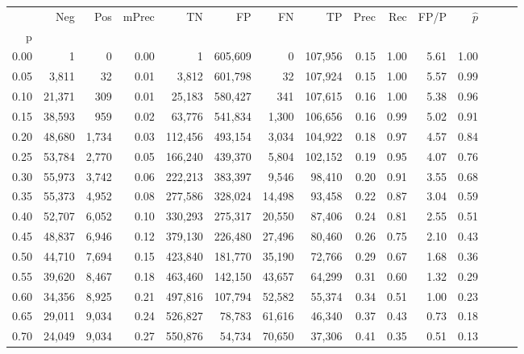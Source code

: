 \begin{tabular}{rrrrrrrrrrrrrrr}
\toprule
{} &     Neg &    Pos & mPrec &       TN &       FP &       FN &       TP &  Prec &   Rec &  FP/P & $\hat{p}$ \\
p    &         &        &       &          &          &          &          &       &       &       &           \\
\midrule
0.00 &       1 &      0 &  0.00 &        1 &  605,609 &        0 &  107,956 &  0.15 &  1.00 &  5.61 &      1.00 \\
0.05 &   3,811 &     32 &  0.01 &    3,812 &  601,798 &       32 &  107,924 &  0.15 &  1.00 &  5.57 &      0.99 \\
0.10 &  21,371 &    309 &  0.01 &   25,183 &  580,427 &      341 &  107,615 &  0.16 &  1.00 &  5.38 &      0.96 \\
0.15 &  38,593 &    959 &  0.02 &   63,776 &  541,834 &    1,300 &  106,656 &  0.16 &  0.99 &  5.02 &      0.91 \\
0.20 &  48,680 &  1,734 &  0.03 &  112,456 &  493,154 &    3,034 &  104,922 &  0.18 &  0.97 &  4.57 &      0.84 \\
0.25 &  53,784 &  2,770 &  0.05 &  166,240 &  439,370 &    5,804 &  102,152 &  0.19 &  0.95 &  4.07 &      0.76 \\
0.30 &  55,973 &  3,742 &  0.06 &  222,213 &  383,397 &    9,546 &   98,410 &  0.20 &  0.91 &  3.55 &      0.68 \\
0.35 &  55,373 &  4,952 &  0.08 &  277,586 &  328,024 &   14,498 &   93,458 &  0.22 &  0.87 &  3.04 &      0.59 \\
0.40 &  52,707 &  6,052 &  0.10 &  330,293 &  275,317 &   20,550 &   87,406 &  0.24 &  0.81 &  2.55 &      0.51 \\
0.45 &  48,837 &  6,946 &  0.12 &  379,130 &  226,480 &   27,496 &   80,460 &  0.26 &  0.75 &  2.10 &      0.43 \\
0.50 &  44,710 &  7,694 &  0.15 &  423,840 &  181,770 &   35,190 &   72,766 &  0.29 &  0.67 &  1.68 &      0.36 \\
0.55 &  39,620 &  8,467 &  0.18 &  463,460 &  142,150 &   43,657 &   64,299 &  0.31 &  0.60 &  1.32 &      0.29 \\
0.60 &  34,356 &  8,925 &  0.21 &  497,816 &  107,794 &   52,582 &   55,374 &  0.34 &  0.51 &  1.00 &      0.23 \\
0.65 &  29,011 &  9,034 &  0.24 &  526,827 &   78,783 &   61,616 &   46,340 &  0.37 &  0.43 &  0.73 &      0.18 \\
0.70 &  24,049 &  9,034 &  0.27 &  550,876 &   54,734 &   70,650 &   37,306 &  0.41 &  0.35 &  0.51 &      0.13 \\

\end{tabular}
